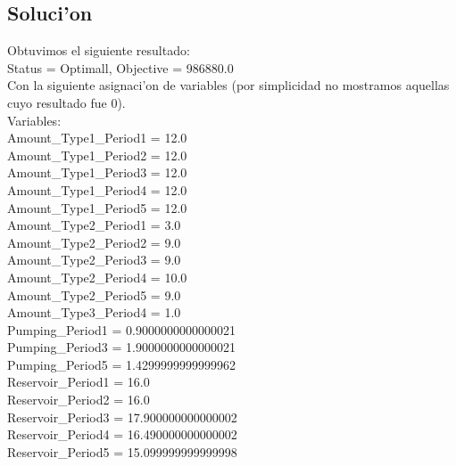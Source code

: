 \subsection{Soluci'on}
Obtuvimos el siguiente resultado:\\
Status = Optimall, Objective = 986880.0\\
Con la siguiente asignaci'on de variables (por simplicidad no mostramos aquellas cuyo resultado fue 0).\\
Variables: \\
Amount\_Type1\_Period1 = 12.0\\
Amount\_Type1\_Period2 = 12.0\\
Amount\_Type1\_Period3 = 12.0\\
Amount\_Type1\_Period4 = 12.0\\
Amount\_Type1\_Period5 = 12.0\\
Amount\_Type2\_Period1 = 3.0\\
Amount\_Type2\_Period2 = 9.0\\
Amount\_Type2\_Period3 = 9.0\\
Amount\_Type2\_Period4 = 10.0\\
Amount\_Type2\_Period5 = 9.0\\
Amount\_Type3\_Period4 = 1.0\\
Pumping\_Period1 = 0.9000000000000021\\
Pumping\_Period3 = 1.9000000000000021\\
Pumping\_Period5 = 1.4299999999999962\\
Reservoir\_Period1 = 16.0\\
Reservoir\_Period2 = 16.0\\
Reservoir\_Period3 = 17.900000000000002\\
Reservoir\_Period4 = 16.490000000000002\\
Reservoir\_Period5 = 15.099999999999998\\
